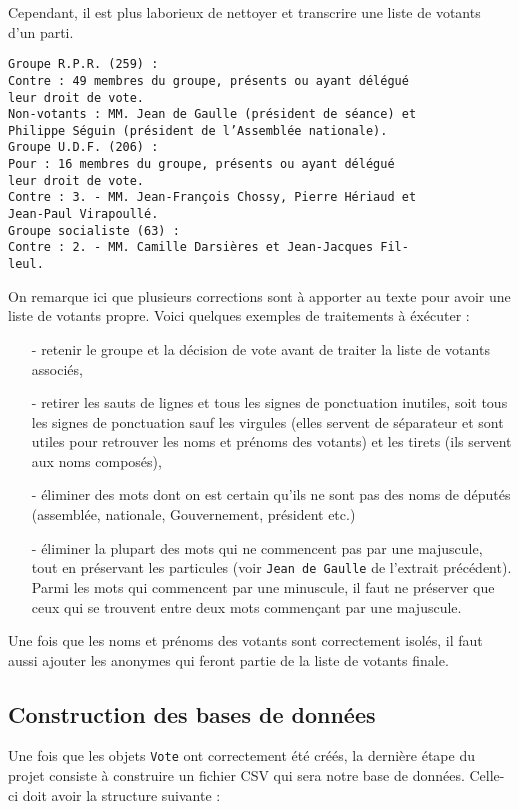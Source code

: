 Cependant, il est plus laborieux de nettoyer et transcrire une liste de votants d'un parti.
\begin{verbatim}
Groupe R.P.R. (259) :
Contre : 49 membres du groupe, présents ou ayant délégué
leur droit de vote.
Non-votants : MM. Jean de Gaulle (président de séance) et
Philippe Séguin (président de l’Assemblée nationale).
Groupe U.D.F. (206) :
Pour : 16 membres du groupe, présents ou ayant délégué
leur droit de vote.
Contre : 3. - MM. Jean-François Chossy, Pierre Hériaud et
Jean-Paul Virapoullé.
Groupe socialiste (63) :
Contre : 2. - MM. Camille Darsières et Jean-Jacques Fil-
leul.
\end{verbatim}

On remarque ici que plusieurs corrections sont à apporter au texte pour avoir une liste de votants propre. Voici quelques exemples de traitements à éxécuter :
\begin{itemize}
\item[-] retenir le groupe et la décision de vote avant de traiter la liste de votants associés,
\item[-] retirer les sauts de lignes et tous les signes de ponctuation inutiles, soit tous les signes de ponctuation sauf les virgules (elles servent de séparateur et sont utiles pour retrouver les noms et prénoms des votants) et les tirets (ils servent aux noms composés),
\item[-] éliminer des mots dont on est certain qu'ils ne sont pas des noms de députés (assemblée, nationale, Gouvernement, président etc.)
\item[-] éliminer la plupart des mots qui ne commencent pas par une majuscule, tout en préservant les particules (voir \verb|Jean de Gaulle| de l'extrait précédent). Parmi les mots qui commencent par une minuscule, il faut ne préserver que ceux qui se trouvent entre deux mots commençant par une majuscule.
\end{itemize}

\vspace{0.3cm}
Une fois que les noms et prénoms des votants sont correctement isolés, il faut aussi ajouter les anonymes qui feront partie de la liste de votants finale.

\subsection{Construction des bases de données}

Une fois que les objets \verb|Vote| ont correctement été créés, la dernière étape du projet consiste à construire un fichier CSV qui sera notre base de données. Celle-ci doit avoir la structure suivante :

